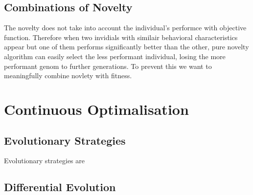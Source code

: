 \subsection{Combinations of Novelty}
The novelty does not take into account the individual's performce with objective function. Therefore when two invidials with similair behavioral characteristics appear but one of them performs significantly better than the other, pure novelty algorithm can easily select the less performant individual, losing the more performant genom to further generations. To prevent this we want to meaningfully combine novlety with fitness.\\

\section{Continuous Optimalisation}
\subsection{Evolutionary Strategies \citep{evoStrategy}}
Evolutionary strategies are 
\subsection{Differential Evolution}

